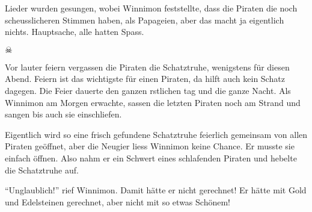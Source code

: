 Lieder wurden gesungen, wobei Winnimon feststellte, dass die Piraten die noch scheusslicheren Stimmen haben, als Papageien, aber das macht ja eigentlich nichts. Hauptsache, alle hatten Spass.


\begin{center}
{\huge $\skull$}
\end{center}

Vor lauter feiern vergassen die Piraten die Schatztruhe, wenigstens für diesen Abend. Feiern ist das wichtigste für einen Piraten, da hilft auch kein Schatz dagegen. Die Feier dauerte den ganzen rstlichen tag und die ganze Nacht. Als Winnimon am Morgen erwachte, sassen die letzten Piraten noch am Strand und sangen bis auch sie einschliefen.

Eigentlich wird so eine frisch gefundene Schatztruhe feierlich gemeinsam von allen Piraten geöffnet, aber die Neugier liess Winnimon keine Chance. Er musste sie einfach öffnen. Also nahm er ein Schwert eines schlafenden Piraten und hebelte die Schatztruhe auf.

\enquote{Unglaublich!} rief Winnimon. Damit hätte er nicht gerechnet! Er hätte mit Gold und Edelsteinen gerechnet, aber nicht mit so etwas Schönem!
